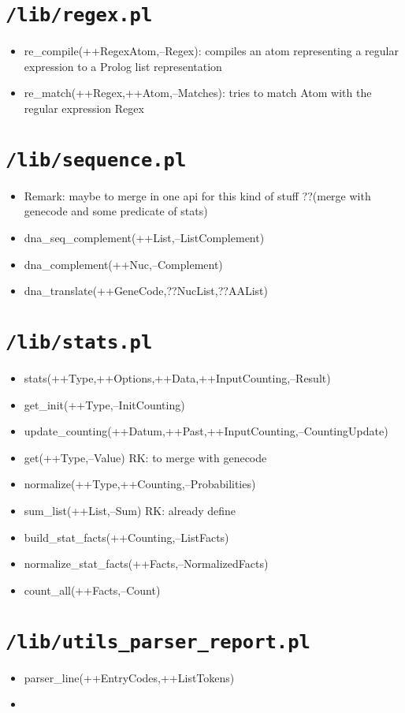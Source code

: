 \section{\texttt{/lib/regex.pl}}
%
\begin{itemize}
\item re\_compile(++RegexAtom,--Regex): compiles an atom representing a regular expression to a Prolog list representation
\item re\_match(++Regex,++Atom,--Matches): tries to match Atom with the regular expression Regex
\end{itemize}

\section{\texttt{/lib/sequence.pl}}
%
\begin{itemize}
\item Remark: maybe to merge in one api for this kind of stuff ??(merge with genecode and some predicate of stats)
\item dna\_seq\_complement(++List,--ListComplement)
\item dna\_complement(++Nuc,--Complement)
\item dna\_translate(++GeneCode,??NucList,??AAList)
\end{itemize}

\section{\texttt{/lib/stats.pl}}
%
\begin{itemize}
\item stats(++Type,++Options,++Data,++InputCounting,--Result)
\item get\_init(++Type,--InitCounting)
\item update\_counting(++Datum,++Past,++InputCounting,--CountingUpdate) 
\item get(++Type,--Value)  RK: to merge with genecode
\item normalize(++Type,++Counting,--Probabilities)
\item sum\_list(++List,--Sum) RK: already define
\item build\_stat\_facts(++Counting,--ListFacts)
\item normalize\_stat\_facts(++Facts,--NormalizedFacts)
\item count\_all(++Facts,--Count)
\end{itemize}


\section{\texttt{/lib/utils\_parser\_report.pl}}
%
\begin{itemize}
\item parser\_line(++EntryCodes,++ListTokens)
\item 
\end{itemize}




